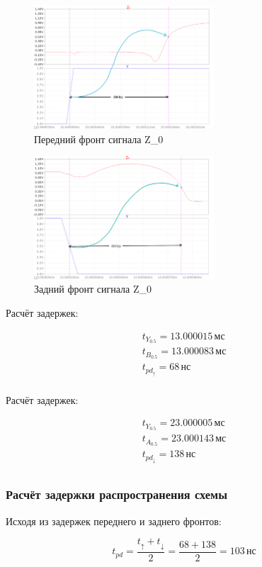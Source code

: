 \setlength{\columnsep}{2.6cm}

\begin{multicols}{2}

	\begin{figure}[H]
		\centering
		\includegraphics[width=0.6\textwidth]{../data/boe_front_delay.png}
		\captionsetup{width=1\textwidth}
		\centering
		\caption{Передний фронт сигнала Z_0}
	\end{figure}

	\begin{figure}[H]
		\centering
		\includegraphics[width=0.6\textwidth]{../data/boe_back_delay.png}
		\captionsetup{width=1\textwidth}
		\centering
		\caption{Задний фронт сигнала Z_0}
	\end{figure}

	\columnbreak

	\centering
	\vspace*{0.9cm}
	Расчёт задержек:

	\vspace*{-0.3cm}
	\[
		\begin{gathered}
			t_{Y_{0.5}} = 13.000015 \, \text{мс} \\
			t_{B_{0.5}} = 13.000083 \, \text{мс} \\
			t_{pd_\uparrow} = 68 \, \text{нс} \\
		\end{gathered}
	\]

	\vspace*{5cm}
	Расчёт задержек:

	\vspace*{-0.3cm}
	\[
		\begin{gathered}
			t_{Y_{0.5}} = 23.000005 \, \text{мс} \\
			t_{A_{0.5}} = 23.000143 \, \text{мс} \\
			t_{pd_\downarrow} = 138 \, \text{нс} \\
		\end{gathered}
	\]
\end{multicols}

\subsubsection{Расчёт задержки распространения схемы}
Исходя из задержек переднего и заднего фронтов:

\[
	t_{pd} = \frac{t_\uparrow + t_\downarrow}{2} = \frac{68+138}{2} = 103 \, \text{нс}
\]
